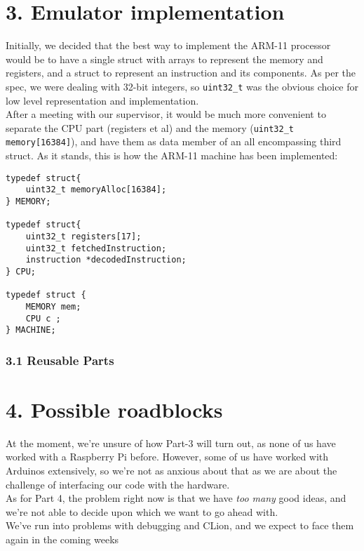 \documentclass[a4paper, twoside]{report}
\begin{document}
\section*{3. Emulator implementation}
Initially, we decided that the best way to implement the ARM-11 processor would be to have a single struct with arrays to represent the memory and registers, and a struct to represent an instruction and its components. As per the spec, we were dealing with 32-bit integers, so \verb|uint32_t| was the obvious choice for low level representation and implementation. \\
After a meeting with our supervisor, it would be much more convenient to separate the CPU part (registers et al) and the memory (\verb|uint32_t memory[16384]|), and have them as data member of an all encompassing third struct. As it stands, this is how the ARM-11 machine has been implemented:
\begin{lstlisting} 
typedef struct{
    uint32_t memoryAlloc[16384];
} MEMORY;

typedef struct{
    uint32_t registers[17];
    uint32_t fetchedInstruction;
    instruction *decodedInstruction;
} CPU;

typedef struct {
    MEMORY mem;
    CPU c ;
} MACHINE;

\end{lstlisting}

\subsubsection*{3.1 Reusable Parts}


\section*{}

\section*{4. Possible roadblocks}
At the moment, we're unsure of how Part-3 will turn out, as none of us have worked with a Raspberry Pi before. However, some of us have worked with Arduinos extensively, so we're not as anxious about that as we are about the challenge of interfacing our code with the hardware. \\ 
As for Part 4, the problem right now is that we have \textit{too many} good ideas, and we're not able to decide upon which we want to go ahead with. \\
We've run into problems with debugging and CLion, and we expect to face them again in the coming weeks
\end{document}
